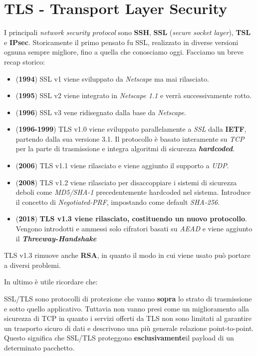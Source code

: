 \chapter{TLS - Transport Layer Security}
I principali \textit{network security protocol} sono \textbf{SSH}, \textbf{SSL} (\textit{secure socket layer}), \textbf{TSL} e \textbf{IPsec}. Storicamente il primo pensato fu SSL, realizzato in diverse versioni ognuna sempre migliore, fino a quella che conosciamo oggi. Facciamo un breve recap storico:
\begin{itemize}
    \item (\textbf{1994}) SSL v1 viene sviluppato da \textit{Netscape} ma mai rilasciato.
    \item (\textbf{1995}) SSL v2 viene integrato in \textit{Netscape 1.1} e verrà successivamente rotto.
    \item(\textbf{1996}) SSL v3 vene ridisegnato dalla base da \textit{Netscape}.
    \item(\textbf{1996-1999}) TLS v1.0 viene sviluppato parallelamente a \textit{SSL} dalla \textbf{IETF}, partendo dalla sua versione 3.1. Il protocollo è basato interamente su \textit{TCP} per la parte di trasmissione e integra algoritmi di sicurezza \textbf{\textit{hardcoded}}.
    \item(\textbf{2006}) TLS v1.1 viene rilasciato e viene aggiunto il supporto a \textit{UDP}. 
    \item(\textbf{2008}) TLS v1.2 viene rilasciato per disaccoppiare i sistemi di sicurezza deboli come \textit{MD5/SHA-1} precedentemente hardcoded nel sistema. Introduce il concetto di \textit{Negotiated-PRF}, impostando come default \textit{SHA-256}.
    \item(\textbf{2018}) \textbf{TLS v1.3 viene rilasciato, costituendo un nuovo protocollo}. Vengono introdotti e ammessi solo cifratori basati su \textit{AEAD} e viene aggiunto il \textbf{\textit{Threeway-Handshake}}
\end{itemize}
\begin{remark}
TLS v1.3 rimuove anche \textbf{RSA}, in quanto il modo in cui viene usato può portare a diversi problemi.
\end{remark}
In ultimo è utile ricordare che:
\begin{proposition}
SSL/TLS sono protocolli di protezione che vanno \textbf{sopra} lo strato di trasmissione e sotto quello applicativo. Tuttavia non vanno presi come un miglioramento alla sicurezza di TCP in quanto i servizi offerti da TLS non sono limitati al garantire un trasporto sicuro di dati e descrivono una più generale relazione point-to-point.\\
Questo significa che SSL/TLS proteggono \textbf{esclusivamente}\footnotemark il payload di un determinato pacchetto.
\end{proposition}
